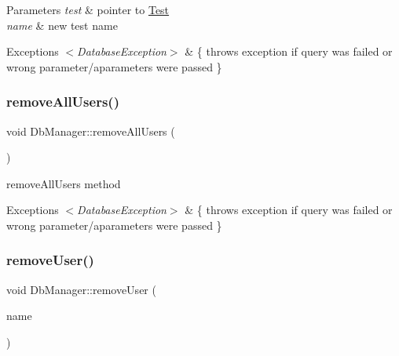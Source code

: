 \begin{DoxyParams}{Parameters}
{\em test} & pointer to \hyperlink{class_test}{Test} \\
\hline
{\em name} & new test name \\
\hline
\end{DoxyParams}

\begin{DoxyExceptions}{Exceptions}
{\em $<$\+Database\+Exception$>$} & \{ throws exception if query was failed or wrong parameter/aparameters were passed \} \\
\hline
\end{DoxyExceptions}
\mbox{\label{class_db_manager_ae88db6e7e58af05cb6da243fa1898398}} 
\subsubsection{\texorpdfstring{remove\+All\+Users()}{removeAllUsers()}}
{\footnotesize\ttfamily void Db\+Manager\+::remove\+All\+Users (\begin{DoxyParamCaption}{ }\end{DoxyParamCaption})}



remove\+All\+Users method 


\begin{DoxyExceptions}{Exceptions}
{\em $<$\+Database\+Exception$>$} & \{ throws exception if query was failed or wrong parameter/aparameters were passed \} \\
\hline
\end{DoxyExceptions}
\mbox{\label{class_db_manager_a9a22cf827ee9cf0ba7b70ffea81c92e1}} 
\subsubsection{\texorpdfstring{remove\+User()}{removeUser()}\hspace{0.1cm}{\footnotesize\ttfamily [1/2]}}
{\footnotesize\ttfamily void Db\+Manager\+::remove\+User (\begin{DoxyParamCaption}\item[{const Q\+String \&}]{name }\end{DoxyParamCaption})}



